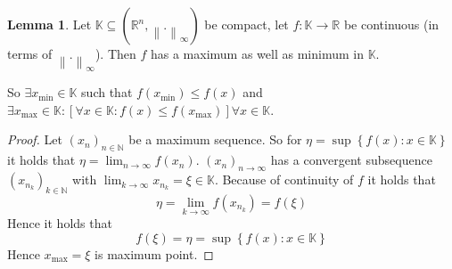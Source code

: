 \documentclass[a4paper,landscape,twocolumn]{article}
\theoremstyle{definition}
\newtheorem{lemma}{Lemma}
\newcommand\set[1]{\left\{#1\right\}}
\newcommand\inorm[1]{\left\|#1\right\|_\infty}
\begin{document}
\begin{lemma}
  Let $\mathbb K \subseteq (\mathbb R^n, \inorm{.})$ be compact,
  let $f: \mathbb K \to \mathbb R$ be continuous (in terms of $\inorm{.}$).
  Then $f$ has a maximum as well as minimum in $\mathbb K$.

  So $\exists x_{\min} \in \mathbb K$ such that $f(x_{\min}) \leq f(x)$
  and $\exists x_{\max} \in \mathbb K: [\forall x \in \mathbb K: f(x) \leq f(x_{\max})] \forall x \in \mathbb K$.
\end{lemma}
\begin{proof}
  Let $(x_n)_{n\in\mathbb N}$ be a maximum sequence. So for $\eta = \sup\set{f(x): x \in \mathbb K}$ it holds that $\eta = \lim_{n\to\infty} f(x_n)$.
  $(x_n)_{n\to\infty}$ has a convergent subsequence $(x_{n_k})_{k\in\mathbb N}$ with $\lim_{k\to\infty} x_{n_k} = \xi \in \mathbb K$. Because of continuity of $f$ it holds that
  \[ \eta = \lim_{k\to\infty} f(x_{n_k}) = f(\xi) \]
  Hence it holds that
  \[ f(\xi) = \eta = \sup\set{f(x): x \in \mathbb K} \]
  Hence $x_{\max} = \xi$ is maximum point.
\end{proof}
\end{document}
